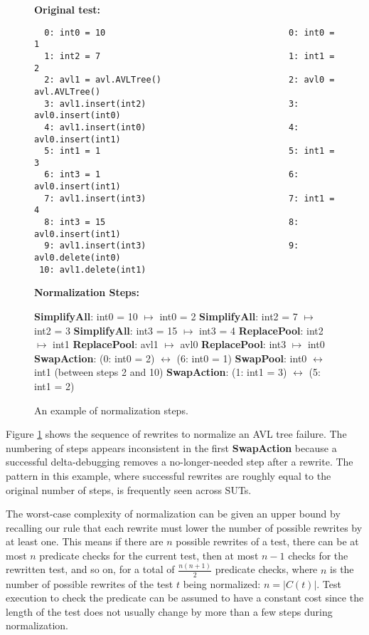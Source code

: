 \begin{figure}
\raggedright
{\bf Original test:}\hspace{1.5in}{\bf Normalized:}
{\scriptsize
\begin{verbatim}
  0: int0 = 10                                    0: int0 = 1
  1: int2 = 7                                     1: int1 = 2
  2: avl1 = avl.AVLTree()                         2: avl0 = avl.AVLTree()
  3: avl1.insert(int2)                            3: avl0.insert(int0) 
  4: avl1.insert(int0)                            4: avl0.insert(int1) 
  5: int1 = 1                                     5: int1 = 3
  6: int3 = 1                                     6: avl0.insert(int1) 
  7: avl1.insert(int3)                            7: int1 = 4
  8: int3 = 15                                    8: avl0.insert(int1)
  9: avl1.insert(int3)                            9: avl0.delete(int0)
 10: avl1.delete(int1) 
\end{verbatim}
}
{\bf Normalization Steps:}
\raggedright
{\scriptsize
\begin{code}
{\bf SimplifyAll}: int0 = 10 $\mapsto$ int0 = 2 
{\bf SimplifyAll}: int2 = 7  $\mapsto$ int2 = 3 
{\bf SimplifyAll}: int3 = 15  $\mapsto$ int3 = 4 
{\bf ReplacePool}: int2 $\mapsto$ int1
{\bf ReplacePool}: avl1 $\mapsto$ avl0
{\bf ReplacePool}: int3 $\mapsto$ int0
{\bf SwapAction}: (0: int0 = 2)  $\leftrightarrow$ (6: int0 = 1)
{\bf SwapPool}: int0 $\leftrightarrow$ int1 (between steps 2 and 10)
{\bf SwapAction}: (1: int1 = 3)  $\leftrightarrow$ (5: int1 = 2)
\end{code}
}
\caption{An example of normalization steps.}
\label{diffnorm}
\end{figure}

Figure \ref{diffnorm} shows the sequence of rewrites to
normalize an AVL tree failure.  The numbering
of steps appears inconsistent in the first {\bf SwapAction} because a
successful delta-debugging removes a no-longer-needed step after a
rewrite.  The pattern in this example, where successful rewrites
are roughly equal to the original number of steps, is frequently seen across SUTs.

The worst-case complexity of normalization can be given an upper bound by recalling our
rule that each rewrite must lower the number of possible rewrites by
at least one.  This means if there are $n$ possible rewrites of a
test, there can be at most $n$ predicate checks for the current test,
then at most $n-1$ checks for the rewritten test, and so on, for
a total of $\frac{n(n+1)}{2}$ predicate checks, where $n$ is the
number of possible rewrites of the test $t$ being normalized:
$n = |C(t)|$.  Test execution to check the predicate can be
assumed to have a constant cost since the length of the test does
not usually change by more than a few steps during normalization. 

